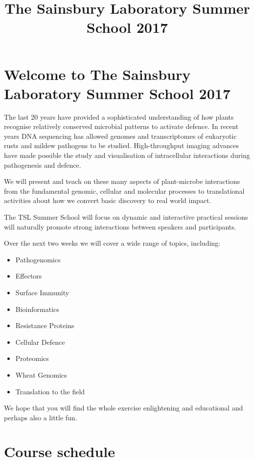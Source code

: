 \documentclass[12pt,]{book}
\title{The Sainsbury Laboratory Summer School 2017}
\author{}
\date{}
\providecommand{\tightlist}{%
  \setlength{\itemsep}{0pt}\setlength{\parskip}{0pt}}
\theoremstyle{definition}
\theoremstyle{definition}
\theoremstyle{remark}
\begin{document}
\maketitle

{
\setcounter{tocdepth}{1}
\tableofcontents
}
\chapter*{Welcome to The Sainsbury Laboratory Summer School
2017}\label{welcome-to-the-sainsbury-laboratory-summer-school-2017}

The last 20 years have provided a sophisticated understanding of how
plants recognise relatively conserved microbial patterns to activate
defence. In recent years DNA sequencing has allowed genomes and
transcriptomes of eukaryotic rusts and mildew pathogens to be studied.
High-throughput imaging advances have made possible the study and
visualisation of intracellular interactions during pathogenesis and
defence.

We will present and teach on these many aspects of plant-microbe
interactions from the fundamental genomic, cellular and molecular
processes to translational activities about how we convert basic
discovery to real world impact.

The TSL Summer School will focus on dynamic and interactive practical
sessions will naturally promote strong interactions between speakers and
participants.

Over the next two weeks we will cover a wide range of topics, including:

\begin{itemize}
\tightlist
\item
  Pathogenomics
\item
  Effectors
\item
  Surface Immunity
\item
  Bioinformatics
\item
  Resistance Proteins
\item
  Cellular Defence
\item
  Proteomics
\item
  Wheat Genomics
\item
  Translation to the field
\end{itemize}

We hope that you will find the whole exercise enlightening and
educational and perhaps also a little fun.

\chapter*{Course schedule}\label{course-schedule}
\end{document}
